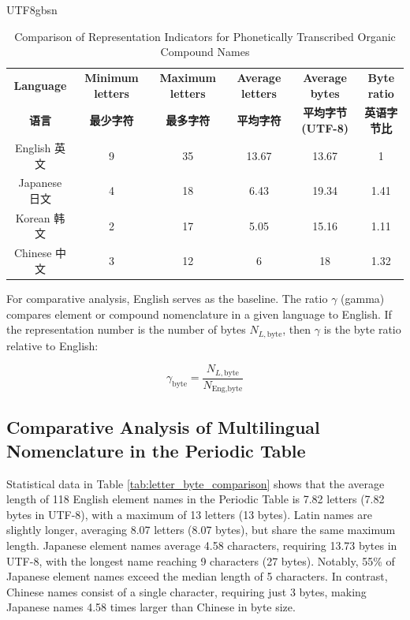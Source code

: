 \documentclass[conference]{IEEEtran}
\begin{document}
\begin{CJK*}{UTF8}{gbsn}
\begin{table}[htbp]
\centering
\caption{Comparison of Representation Indicators for Phonetically Transcribed Organic Compound Names}
\label{tab:comparison}
\begin{tabular}{cccccc}
\hline
\textbf{Language} & \textbf{Minimum letters} & \textbf{Maximum letters} & \textbf{Average letters} & \textbf{Average bytes} & \textbf{Byte ratio} \\
\textbf{语言} & \textbf{最少字符} & \textbf{最多字符} & \textbf{平均字符} & \textbf{平均字节(UTF-8)} & \textbf{英语字节比} \\
\hline
English 英文 & 9 & 35 & 13.67 & 13.67 & 1 \\

Japanese 日文 & 4 & 18 & 6.43 & 19.34 & 1.41 \\

Korean 韩文 & 2 & 17 & 5.05 & 15.16 & 1.11 \\

Chinese 中文 & 3 & 12 & 6 & 18 & 1.32 \\
\hline
\end{tabular}
\end{table}

For comparative analysis, English serves as the baseline. The ratio $\gamma$ (gamma) compares element or compound nomenclature in a given language to English. If the representation number is the number of bytes $N_{L,\text{byte}}$, then $\gamma$ is the byte ratio relative to English:


\begin{equation}
\gamma_{\text{byte}} = \frac{N_{L,\text{byte}}}{N_{\text{Eng},\text{byte}}}
\label{eq:byte_ratio}
\end{equation}


\subsection{Comparative Analysis of Multilingual Nomenclature in the Periodic Table}
Statistical data in Table \ref{tab:letter_byte_comparison} shows that the average length of 118 English element names in the Periodic Table is 7.82 letters (7.82 bytes in UTF-8), with a maximum of 13 letters (13 bytes). Latin names are slightly longer, averaging 8.07 letters (8.07 bytes), but share the same maximum length. Japanese element names average 4.58 characters, requiring 13.73 bytes in UTF-8, with the longest name reaching 9 characters (27 bytes). Notably, 55\% of Japanese element names exceed the median length of 5 characters. In contrast, Chinese names consist of a single character, requiring just 3 bytes, making Japanese names 4.58 times larger than Chinese in byte size. 


\end{CJK*}
\end{document}
